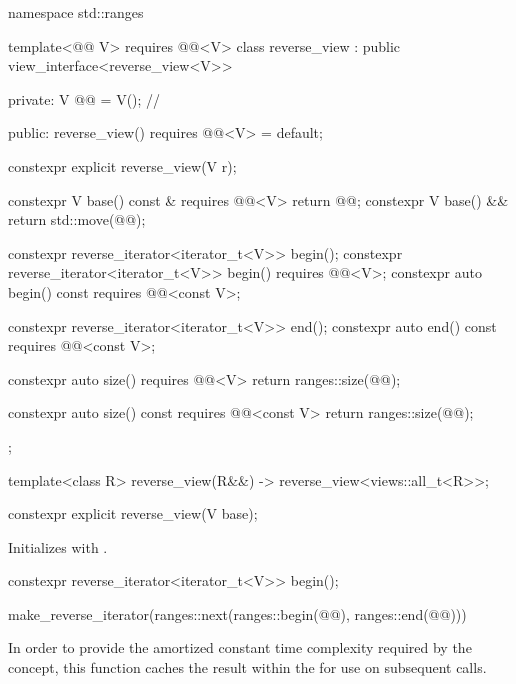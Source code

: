 %
%
%
\begin{codeblock}
namespace std::ranges {
  template<@@ V>
    requires @@<V>
  class reverse_view : public view_interface<reverse_view<V>> {
  private:
    V @@ = V();  // \expos

  public:
    reverse_view() requires @@<V> = default;

    constexpr explicit reverse_view(V r);

    constexpr V base() const & requires @@<V> { return @@; }
    constexpr V base() && { return std::move(@@); }

    constexpr reverse_iterator<iterator_t<V>> begin();
    constexpr reverse_iterator<iterator_t<V>> begin() requires @@<V>;
    constexpr auto begin() const requires @@<const V>;

    constexpr reverse_iterator<iterator_t<V>> end();
    constexpr auto end() const requires @@<const V>;

    constexpr auto size() requires @@<V> {
      return ranges::size(@@);
    }

    constexpr auto size() const requires @@<const V> {
      return ranges::size(@@);
    }
  };

  template<class R>
    reverse_view(R&&) -> reverse_view<views::all_t<R>>;
}
\end{codeblock}

%
\begin{itemdecl}
constexpr explicit reverse_view(V base);
\end{itemdecl}

\begin{itemdescr}
\pnum
\effects
Initializes  with .
\end{itemdescr}

%
\begin{itemdecl}
constexpr reverse_iterator<iterator_t<V>> begin();
\end{itemdecl}

\begin{itemdescr}
\pnum
\returns
\begin{codeblock}
make_reverse_iterator(ranges::next(ranges::begin(@@), ranges::end(@@)))
\end{codeblock}

\pnum
\remarks
In order to provide the amortized constant time complexity required by
the  concept, this function caches the result within the
 for use on subsequent calls.
\end{itemdescr}

